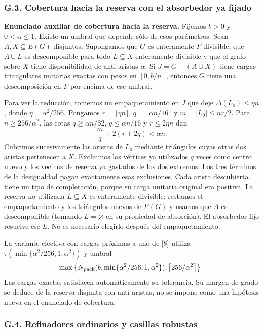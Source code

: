 \documentclass[spanish,11pt,a4paper]{article}
\begin{document}
\subsubsection{G.3. Cobertura hacia la reserva con el absorbedor ya fijado}\label{g.3.-cobertura-hacia-la-reserva-con-el-absorbedor-ya-fijado}

\textbf{Enunciado auxiliar de cobertura hacia la reserva.} Fijemos \(b>0\) y \(0<\alpha\le1\). Existe un umbral que depende sólo de esos parámetros. Sean \(A,X\subseteq E(G)\) disjuntos. Supongamos que \(G\) es enteramente \(F\)-divisible, que \(A\cup L\) es descomponible para todo \(L\subseteq X\) enteramente divisible y que el grafo sobre \(X\) tiene disponibilidad de anti-aristas \(\alpha\). Si \(J=G-(A\cup X)\) tiene cargas triangulares unitarias exactas con pesos en \([0,b/n]\), entonces \(G\) tiene una descomposición en \(F\) por encima de ese umbral.

Para ver la reducción, tomemos un empaquetamiento en \(J\) que deje \(\Delta(L_0)\le\eta n\), donde \(\eta=\alpha^2/256\). Pongamos \(r=\lceil\eta n\rceil\), \(q=\lfloor\alpha n/16\rfloor\) y \(m=|L_0|\le nr/2\). Para \(n\ge256/\alpha^2\), las cotas \(q\ge\alpha n/32\), \(q\le\alpha n/16\) y \(r\le2\eta n\) dan \[\frac m q+2(r+2q)<\alpha n.\] Cubrimos sucesivamente las aristas de \(L_0\) mediante triángulos cuyas otras dos aristas pertenecen a \(X\). Excluimos los vértices ya utilizados \(q\) veces como centro nuevo y los vecinos de reserva ya gastados de los dos extremos. Los tres términos de la desigualdad pagan exactamente esas exclusiones. Cada arista descubierta tiene un tipo de completación, porque su carga unitaria original era positiva. La reserva no utilizada \(L\subseteq X\) es enteramente divisible: restamos el empaquetamiento y los triángulos nuevos de \(E(G)\) y usamos que \(A\) es descomponible (tomando \(L=\varnothing\) en su propiedad de absorción). El absorbedor fijo resuelve ese \(L\). No es necesario elegirlo después del empaquetamiento.

La variante efectiva con cargas próximas a uno de {[}8{]} utiliza \(\tau(\min\{\alpha^2/256,1,\alpha^2\})\) y umbral \[\max\left\{N_{\rm pack}(b,\min\{\alpha^2/256,1,\alpha^2\}),
\left\lceil256/\alpha^2\right\rceil\right\}.\] Las cargas exactas satisfacen automáticamente su tolerancia. Su margen de grado se deduce de la reserva disjunta con anti-aristas, no se impone como una hipótesis nueva en el enunciado de cobertura.

\subsubsection{G.4. Refinadores ordinarios y casillas robustas}\label{g.4.-refinadores-ordinarios-y-casillas-robustas}
\end{document}
